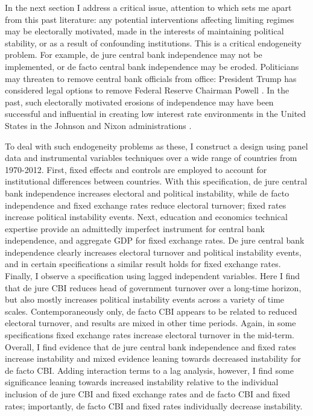 \documentclass{article}
\begin{document}
    In the next section I address a critical issue, attention to which sets me apart from this past literature: any potential interventions affecting limiting regimes may be electorally motivated, made in the interests of maintaining political stability, or as a result of confounding institutions. This is a critical endogeneity problem. For example, de jure central bank independence may not be implemented, or de facto central bank independence may be eroded. Politicians may threaten to remove central bank officials from office: President Trump has considered legal options to remove Federal Reserve Chairman Powell \citep{corbett_can_2019}. In the past, such electorally motivated erosions of independence may have been successful and influential in creating low interest rate environments in the United States in the Johnson and Nixon administrations \citep{binder_trump_2019}.

    To deal with such endogeneity problems as these, I construct a design using panel data and instrumental variables techniques over a wide range of countries from 1970-2012. First, fixed effects and controls are employed to account for institutional differences between countries. With this specification, de jure central bank independence increases electoral and political instability, while de facto independence and fixed exchange rates reduce electoral turnover; fixed rates increase political instability events. Next, education and economics technical expertise provide an admittedly imperfect instrument for central bank independence, and aggregate GDP for fixed exchange rates. De jure central bank independence clearly increases electoral turnover and political instability events, and in certain specifications a similar result holds for fixed exchange rates. Finally, I observe a specification using lagged independent variables. Here I find that de jure CBI reduces head of government turnover over a long-time horizon, but also mostly increases political instability events across a variety of time scales. Contemporaneously only, de facto CBI appears to be related to reduced electoral turnover, and results are mixed in other time periods. Again, in some specifications fixed exchange rates increase electoral turnover in the mid-term. Overall, I find evidence that de jure central bank independence and fixed rates increase instability and mixed evidence leaning towards decreased instability for de facto CBI. Adding interaction terms to a lag analysis, however, I find some significance leaning towards increased instability relative to the individual inclusion of de jure CBI and fixed exchange rates and de facto CBI and fixed rates; importantly, de facto CBI and fixed rates individually decrease instability.
\end{document}
